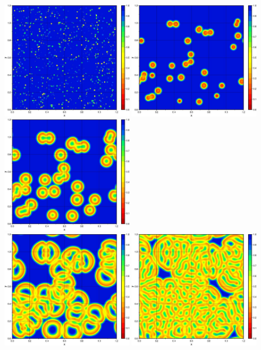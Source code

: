 \begin{center}
\includegraphics[width=5.6cm]{python_codes/fieldstone_171/images/uu000000.jpg}
\includegraphics[width=5.6cm]{python_codes/fieldstone_171/images/uu000001.jpg}
\includegraphics[width=5.6cm]{python_codes/fieldstone_171/images/uu000003.jpg}\\
\includegraphics[width=5.6cm]{python_codes/fieldstone_171/images/uu000007.jpg}
\includegraphics[width=5.6cm]{python_codes/fieldstone_171/images/uu000012.jpg}

\end{center}
